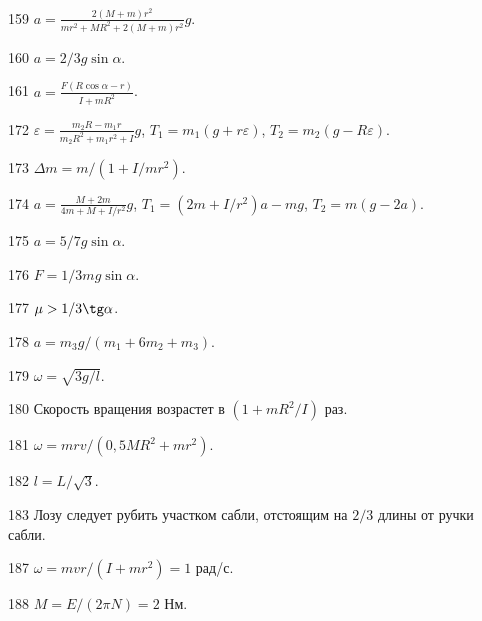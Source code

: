 \begin{Answer}{159}
$a = \frac{2(M+m)r^2}{mr^2+MR^2+2(M+m)r^2}g$.
\end{Answer}
\begin{Answer}{160}
$a=2/3g\sin \alpha$.
\end{Answer}
\begin{Answer}{161}
$a = \frac{F(R\cos \alpha - r)}{I + mR^2}$.
\end{Answer}
\begin{Answer}{172}
$\varepsilon = \frac{m_2R - m_1r}{m_2R^2 + m_1r^2 + I}g$, $T_1 = m_1(g+r\varepsilon)$, $T_2 = m_2(g-R\varepsilon)$.
\end{Answer}
\begin{Answer}{173}
$\Delta m = m/(1+I/mr^2)$.
\end{Answer}
\begin{Answer}{174}
$a = \frac{M+2m}{4m+M+I/r^2}g$, $T_1 = (2m+I/r^2)a - mg$, $T_2=m(g-2a)$.
\end{Answer}
\begin{Answer}{175}
$a=5/7g\sin \alpha$.
\end{Answer}
\begin{Answer}{176}
$F = 1/3 mg \sin \alpha$.
\end{Answer}
\begin{Answer}{177}
$\mu > 1/3 \tg \alpha$.
\end{Answer}
\begin{Answer}{178}
$a = m_3g/(m_1 + 6m_2 +m_3)$.
\end{Answer}
\begin{Answer}{179}
$\omega = \sqrt{3g/l}$.
\end{Answer}
\begin{Answer}{180}
Скорость вращения возрастет в $(1+mR^2/I)$ раз.
\end{Answer}
\begin{Answer}{181}
$\omega = mrv/(0,5MR^2 + mr^2)$.
\end{Answer}
\begin{Answer}{182}
$l = L/\sqrt{3}$.
\end{Answer}
\begin{Answer}{183}
Лозу следует рубить участком сабли, отстоящим на $2/3$ длины от ручки сабли.
\end{Answer}
\begin{Answer}{187}
$\omega = mvr/(I+mr^2) = 1$ рад/с.
\end{Answer}
\begin{Answer}{188}
$M = E / (2 \pi N) = 2$ Нм.
\end{Answer}
